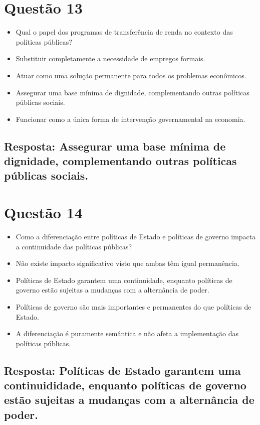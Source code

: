 \documentclass[
   article,       
   12pt,          
   oneside,       
   a4paper,       
   english,       
   brazil,        
   sumario=tradicional
   ]{abntex2}
\begin{document}
\section{Questão 13}
\begin{itemize}
    \item Qual o papel dos programas de transferência de renda no contexto das políticas públicas?
    \item Substituir completamente a necessidade de empregos formais.
    \item Atuar como uma solução permanente para todos os problemas econômicos.
    \item Assegurar uma base mínima de dignidade, complementando outras políticas públicas sociais.
    \item Funcionar como a única forma de intervenção governamental na economia.
\end{itemize}
\subsection{Resposta: Assegurar uma base mínima de dignidade, complementando outras políticas públicas sociais.}

\section{Questão 14}
\begin{itemize}
    \item Como a diferenciação entre políticas de Estado e políticas de governo impacta a continuidade das políticas públicas?
    \item Não existe impacto significativo visto que ambas têm igual permanência.
    \item Políticas de Estado garantem uma continuidade, enquanto políticas de governo estão sujeitas a mudanças com a alternância de poder.
    \item Políticas de governo são mais importantes e permanentes do que políticas de Estado.
    \item A diferenciação é puramente semântica e não afeta a implementação das políticas públicas.
\end{itemize}
\subsection{Resposta: Políticas de Estado garantem uma continuididade, enquanto políticas de governo estão sujeitas a mudanças com a alternância de poder.}
\end{document}
